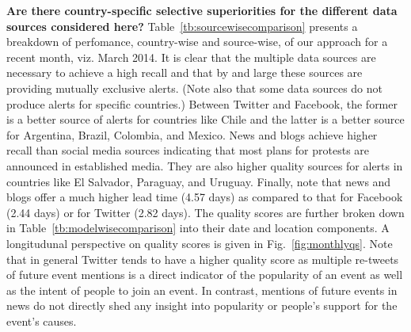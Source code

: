 \documentclass[letterpaper]{article}
\begin{document}
\noindent
{\bf Are there country-specific selective superiorities for the different data sources considered here?}
Table~\ref{tb:sourcewisecomparison} presents a breakdown of perfomance, country-wise and source-wise, of 
our approach for a recent month, viz. March 2014.
It is clear that the multiple data sources are necessary to achieve a high recall and that by and large
these sources are providing mutually exclusive alerts. (Note also that some data sources do not produce alerts for specific
countries.) Between Twitter and Facebook, the former is a better
source of alerts for countries like Chile and the latter is a better source for Argentina, Brazil, Colombia, and Mexico.
News and blogs achieve higher recall than social media sources indicating that most plans for protests are announced
in established media. They are also
higher quality sources for alerts in countries like El Salvador, Paraguay, and Uruguay.
Finally, note that news and blogs offer a much higher lead time (4.57 days) 
as compared to that for Facebook (2.44 days) or for Twitter (2.82 days). The quality scores are
further broken down in Table~\ref{tb:modelwisecomparison} into their date and location components.
A longitudunal perspective on quality scores is
given in Fig.~\ref{fig:monthlyqs}. Note that in general Twitter tends to have a higher quality score
as multiple re-tweets of future event mentions is a direct indicator of the popularity of an event as 
well as the intent of people to join an event. 
In contrast, mentions of future events in news do not directly shed any insight into popularity or people's
support for the event's causes.\\
\end{document}
